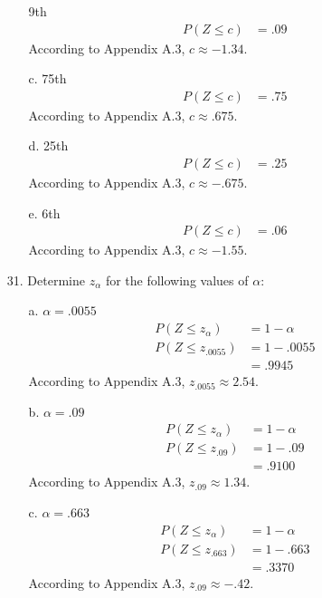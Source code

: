 \documentclass[letterpaper,12pt]{article}
\begin{document}
\begin{enumerate}
\begin{enumerate}
        9th
        \begin{align*}
          P(Z \le c) &= .09
        \end{align*}
        According to Appendix A.3, $c \approx -1.34$.
      \item[c.]
        75th
        \begin{align*}
          P(Z \le c) &= .75
        \end{align*}
        According to Appendix A.3, $c \approx .675$.
      \item[d.]
        25th
        \begin{align*}
          P(Z \le c) &= .25
        \end{align*}
        According to Appendix A.3, $c \approx -.675$.
      \item[e.]
        6th
        \begin{align*}
          P(Z \le c) &= .06
        \end{align*}
        According to Appendix A.3, $c \approx -1.55$.
    \end{enumerate}
  \item[31.]
    Determine $z_\alpha$ for the following values of $\alpha$:
    \begin{enumerate}
      \item[a.]
        $\alpha = .0055$
        \begin{align*}
          P(Z \le z_\alpha) &= 1 - \alpha \\
          P(Z \le z_{.0055}) &= 1 - .0055 \\
          &= .9945
        \end{align*}
        According to Appendix A.3, $z_{.0055} \approx 2.54$.
      \item[b.]
        $\alpha = .09$
        \begin{align*}
          P(Z \le z_\alpha) &= 1 - \alpha \\
          P(Z \le z_{.09}) &= 1 - .09 \\
          &= .9100
        \end{align*}
        According to Appendix A.3, $z_{.09} \approx 1.34$.
      \item[c.]
        $\alpha = .663$
        \begin{align*}
          P(Z \le z_\alpha) &= 1 - \alpha \\
          P(Z \le z_{.663}) &= 1 - .663 \\
          &= .3370
        \end{align*}
        According to Appendix A.3, $z_{.09} \approx -.42$.

\end{enumerate}
\end{enumerate}
\end{document}
